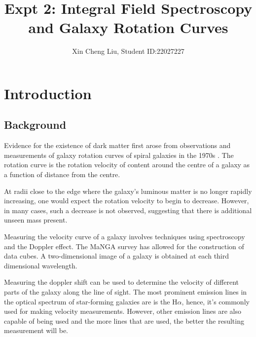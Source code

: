 \documentclass{article}
\title{Expt 2: Integral Field Spectroscopy and Galaxy Rotation Curves}
\author{Xin Cheng Liu, Student ID:22027227}
\date{}
\begin{document}
\maketitle

\section{Introduction}
\subsection{Background}
Evidence for the existence of dark matter first arose from observations and measurements of galaxy rotation curves 
of spiral galaxies in the 1970s \cite{einasto1974dynamic}\cite{ostriker1974size}\cite{roberts1973comparison}\cite{rubin1970rotation}.
The rotation curve is the rotation velocity of content around the centre of a galaxy as a function of distance from 
the centre. 

At radii close to the edge where the galaxy's luminous matter is no longer rapidly increasing, one would expect the 
rotation velocity to begin to decrease. However, in many cases, such a decrease is not observed, suggesting that 
there is additional unseen mass present. 

Measuring the velocity curve of a galaxy involves techniques using spectroscopy and the Doppler effect. The MaNGA
\cite{bundy2014overview} survey has allowed for the construction of data cubes. A two-dimensional image of a galaxy 
is obtained at each third dimensional wavelength. 

Measuring the doppler shift can be used to determine the velocity of different parts of the galaxy along
the line of sight. The most prominent emission lines in the optical spectrum of star-forming galaxies are 
is the H$\alpha$, hence, it's commonly used for making velocity measurements. However, other emission lines are
also capable of being used and the more lines that are used, the better the resulting measurement will be.
\end{document}

